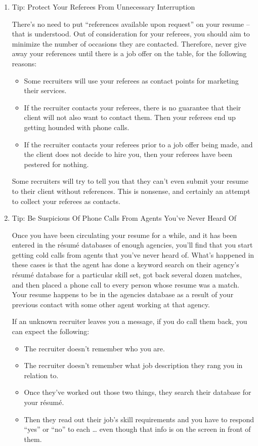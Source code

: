 \documentclass{article}
\begin{document}
\begin{enumerate}
\begin{enumerate}
\item Tip: Protect Your Referees From Unnecessary Interruption
\label{sec:orgheadline114}

There's no need to put “references available upon request” on your
resume -- that is understood. Out of consideration for your referees,
you should aim to minimize the number of occasions they are contacted.
Therefore, never give away your references until there is a job offer on
the table, for the following reasons:

\begin{itemize}
\item Some recruiters will use your referees as contact points for
marketing their services.
\item If the recruiter contacts your referees, there is no guarantee that
their client will not also want to contact them. Then your referees
end up getting hounded with phone calls.
\item If the recruiter contacts your referees prior to a job offer being
made, and the client does not decide to hire you, then your referees
have been pestered for nothing.
\end{itemize}

Some recruiters will try to tell you that they can't even submit your
resume to their client without references. This is nonsense, and
certainly an attempt to collect your referees as contacts.

\item Tip: Be Suspicious Of Phone Calls From Agents You've Never Heard
\label{sec:orgheadline115}
Of

Once you have been circulating your resume for a while, and it has been
entered in the résumé databases of enough agencies, you'll find that you
start getting cold calls from agents that you've never heard of. What's
happened in these cases is that the agent has done a keyword search on
their agency's résumé database for a particular skill set, got back
several dozen matches, and then placed a phone call to every person
whose resume was a match. Your resume happens to be in the agencies
database as a result of your previous contact with some other agent
working at that agency.

If an unknown recruiter leaves you a message, if you do call them back,
you can expect the following:

\begin{itemize}
\item The recruiter doesn't remember who you are.
\item The recruiter doesn't remember what job description they rang you in
relation to.
\item Once they've worked out those two things, they search their database
for your résumé.
\item Then they read out their job's skill requirements and you have to
respond “yes” or “no” to each \ldots{} even though that info is on the
screen in front of them.
\end{itemize}


\end{enumerate}
\end{enumerate}
\end{document}
